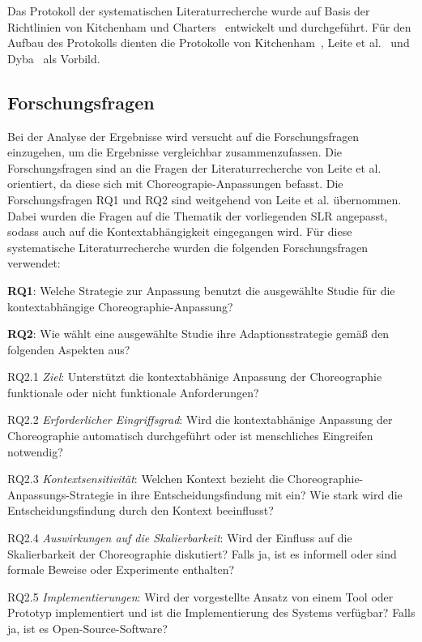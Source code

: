 \documentclass[conference,compsoc,ngerman]{IEEEtran}
\begin{document}
Das Protokoll der systematischen Literaturrecherche wurde auf Basis der Richtlinien von Kitchenham und Charters~\cite{keele2007guidelines} entwickelt und durchgeführt. Für den Aufbau des Protokolls dienten die Protokolle von Kitchenham~\cite{kitchenham2009systematic}, Leite et al.~\cite{leite2013systematic} und Dyba~\cite{dybaa2008empirical} als Vorbild.
\subsection{Forschungsfragen}\label{ss:forschungsfragen}
Bei der Analyse der Ergebnisse wird versucht auf die Forschungsfragen einzugehen, um die Ergebnisse vergleichbar zusammenzufassen.
Die Forschungsfragen sind an die Fragen der Literaturrecherche von Leite et al.~\cite{leite2013systematic} orientiert, da diese sich mit Choreograpie-Anpassungen befasst. Die Forschungsfragen RQ1 und RQ2 sind weitgehend von Leite et al.\cite{leite2013systematic} übernommen. Dabei wurden die Fragen auf die Thematik der vorliegenden SLR angepasst, sodass auch auf die Kontextabhängigkeit eingegangen wird.
Für diese systematische Literaturrecherche wurden die folgenden Forschungsfragen verwendet:


\textbf{RQ1}: Welche Strategie zur Anpassung benutzt die ausgewählte Studie für die kontextabhängige Choreographie-Anpassung? 

\textbf{RQ2}: Wie wählt eine ausgewählte Studie ihre Adaptionsstrategie gemäß den folgenden Aspekten aus?

RQ2.1 \textit{Ziel}: Unterstützt die kontextabhänige Anpassung der Choreographie funktionale oder nicht funktionale Anforderungen?

RQ2.2 \textit{Erforderlicher Eingriffsgrad}: Wird die kontextabhänige Anpassung der Choreographie automatisch durchgeführt oder ist menschliches Eingreifen notwendig?

RQ2.3 \textit{Kontextsensitivität}: Welchen Kontext bezieht die Choreographie-Anpassungs-Strategie in ihre Entscheidungsfindung mit ein? Wie stark wird die Entscheidungsfindung durch den Kontext beeinflusst?

RQ2.4 \textit{Auswirkungen auf die Skalierbarkeit}: Wird der Einfluss auf die Skalierbarkeit der Choreographie diskutiert? Falls ja, ist es informell oder sind formale Beweise oder Experimente enthalten?

RQ2.5 \textit{Implementierungen}: Wird der vorgestellte Ansatz von einem Tool oder Prototyp implementiert und ist die Implementierung des Systems verfügbar? Falls ja, ist es Open-Source-Software?
\end{document}
